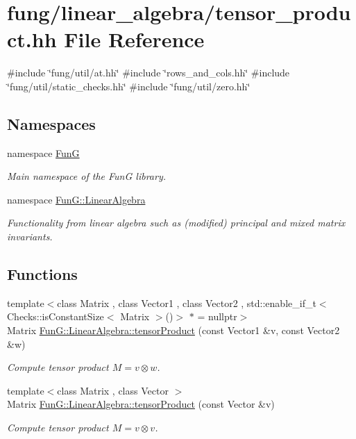 \hypertarget{tensor__product_8hh}{\section{fung/linear\-\_\-algebra/tensor\-\_\-product.hh \-File \-Reference}
\label{tensor__product_8hh}
}
{\ttfamily \#include \char`\"{}fung/util/at.\-hh\char`\"{}}\*
{\ttfamily \#include \char`\"{}rows\-\_\-and\-\_\-cols.\-hh\char`\"{}}\*
{\ttfamily \#include \char`\"{}fung/util/static\-\_\-checks.\-hh\char`\"{}}\*
{\ttfamily \#include \char`\"{}fung/util/zero.\-hh\char`\"{}}\*
\subsection*{\-Namespaces}
\begin{DoxyCompactItemize}
\item 
namespace \hyperlink{namespaceFunG}{\-Fun\-G}
\begin{DoxyCompactList}\small\item\em \-Main namespace of the \-Fun\-G library. \end{DoxyCompactList}\item 
namespace \hyperlink{namespaceFunG_1_1LinearAlgebra}{\-Fun\-G\-::\-Linear\-Algebra}
\begin{DoxyCompactList}\small\item\em \-Functionality from linear algebra such as (modified) principal and mixed matrix invariants. \end{DoxyCompactList}\end{DoxyCompactItemize}
\subsection*{\-Functions}
\begin{DoxyCompactItemize}
\item 
{\footnotesize template$<$class Matrix , class Vector1 , class Vector2 , std\-::enable\-\_\-if\-\_\-t$<$ Checks\-::is\-Constant\-Size$<$ Matrix $>$()$>$ $\ast$  = nullptr$>$ }\\\-Matrix \hyperlink{group__LinearAlgebraGroup_ga5d0e066e6184fb3324d96d20087b5578}{\-Fun\-G\-::\-Linear\-Algebra\-::tensor\-Product} (const \-Vector1 \&v, const \-Vector2 \&w)
\begin{DoxyCompactList}\small\item\em \-Compute tensor product $ M = v \otimes w $. \end{DoxyCompactList}\item 
{\footnotesize template$<$class Matrix , class Vector $>$ }\\\-Matrix \hyperlink{group__LinearAlgebraGroup_gae5e82b9e66319511dae5ff0d9304a6b7}{\-Fun\-G\-::\-Linear\-Algebra\-::tensor\-Product} (const \-Vector \&v)
\begin{DoxyCompactList}\small\item\em \-Compute tensor product $ M = v \otimes v $. \end{DoxyCompactList}\end{DoxyCompactItemize}
